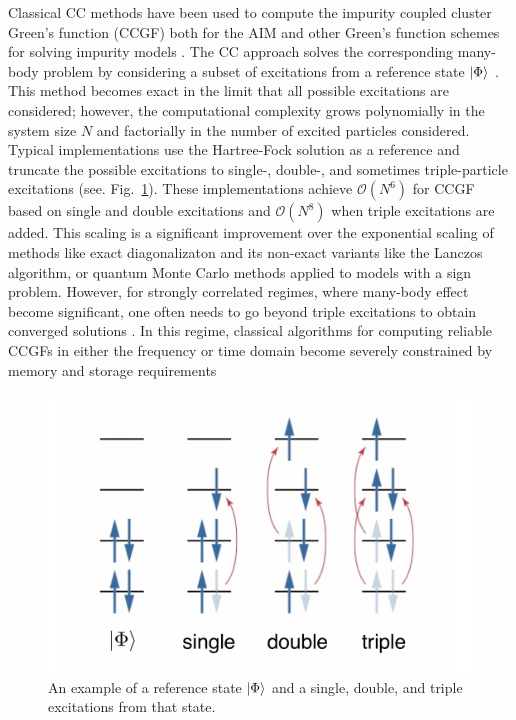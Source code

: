 \documentclass[aip,reprint,table,xcdraw,usenames,dvipsnames]{revtex4-1}
\begin{document}
Classical CC methods have been used to compute the impurity coupled cluster Green's function (CCGF) \cite{nooijen92_55, nooijen93_15, nooijen95_1681} both for the AIM and other Green's function schemes for solving impurity models \cite{PhysRevB.100.115154,JCTC.15.6010}. The CC approach solves the corresponding many-body problem by considering a subset of excitations from a reference state $\ket{\Phi}$ \cite{coester58_421, coester60_477, cizek66_4256, paldus72_50, purvis82_1910}. This method becomes exact in the limit that all possible excitations are considered; however, the computational complexity grows polynomially in the system size $N$ and factorially in the number of excited particles considered. Typical implementations use the Hartree-Fock solution as a reference and truncate the possible excitations to single-, double-, and sometimes triple-particle excitations (see. Fig.~\ref{fig:CCSD}). These implementations achieve $\mathcal{O}(N^6)$ for CCGF based on single and double excitations and $\mathcal{O}(N^8)$ when triple excitations are added. This scaling is a significant improvement over the exponential scaling of methods like exact diagonalizaton and its non-exact variants like the Lanczos algorithm, or quantum Monte Carlo methods applied to models with a sign problem. However, 
for strongly correlated regimes, where many-body effect become significant, one often needs to go beyond triple excitations to obtain converged solutions \cite{Bartlett07RMP}. In this regime, classical algorithms for computing reliable CCGFs in either the frequency or time domain become severely constrained by memory and storage requirements~\cite{kowalski16_144101, kowalski18_4335, peng19_3185, vila20_6983.}

\begin{figure}
    \centering
    \includegraphics[width=0.75\columnwidth, keepaspectratio]{CCSDT.png}
    \caption{An example of a reference state $\ket{\Phi}$ and a single, double, and triple excitations from that state.}
    \label{fig:CCSD}
\end{figure}
\end{document}
